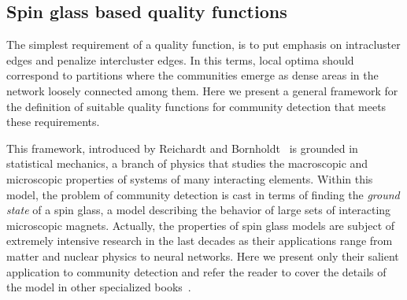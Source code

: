 \subsection{Spin glass based quality functions}
The simplest requirement of a quality function, is to put emphasis on intracluster edges and penalize intercluster edges. In this terms, local optima should correspond to partitions where the communities emerge as dense areas in the network loosely connected among them.
Here we present a general framework for the definition of suitable quality functions for community detection that meets these requirements.

This framework, introduced by Reichardt and Bornholdt~\cite{reichardt2006} is grounded in statistical mechanics, a branch of physics that studies the macroscopic and microscopic properties of systems of many interacting elements. Within this model, the problem of community detection is cast in terms of finding the \emph{ground state} of a spin glass, a model describing the behavior of large sets of interacting microscopic magnets.
Actually, the properties of spin glass models are subject of extremely intensive research in the last decades as their applications range from matter and nuclear physics to neural networks. Here we present only their salient application to community detection and refer the reader to cover the details of the model in other specialized books~\cite{mezard1990}.

